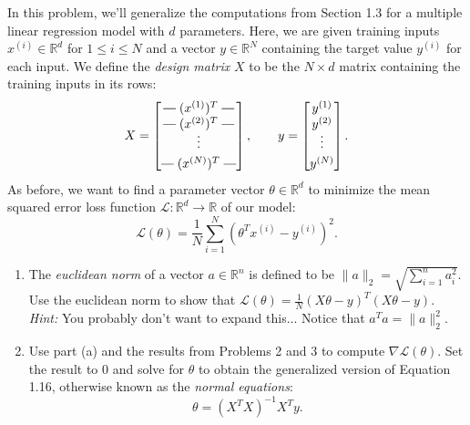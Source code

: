 \documentclass{article}
\newcommand{\R}{\mathbb{R}}
\newcommand{\rotvert}{\rotatebox[origin=c]{90}{$\vert$}}
\newenvironment{envsection}[1]{\begin{trivlist}
\item[\hskip \labelsep {\bfseries #1}]}{\end{trivlist}}
\begin{document}
\begin{envsection}{Problem 4 (Normal Equations).}
    In this problem, we'll generalize the computations from Section 1.3 for a multiple linear regression model with $d$ parameters. Here, we are given training inputs $x^{(i)} \in \R^d$ for $1 \leq i \leq N$ and a vector $y \in \R^N$ containing the target value $y^{(i)}$ for each input. We define the \textit{design matrix} $X$ to be the $N \times d$ matrix containing the training inputs in its rows:
    \[
    X =
    \begin{bmatrix}
        \rotvert\; (x^{(1)})^T \;\rotvert\\
        \rotvert\; (x^{(2)})^T \;\rotvert\vspace{-3pt}\\
        \vdots \vspace{3pt}\\
        \rotvert\; (x^{(N)})^T \;\rotvert
    \end{bmatrix}, \qquad
    y = 
    \begin{bmatrix}
        y^{(1)}\\
        y^{(2)}\vspace{-3pt}\\
        \vdots\vspace{3pt}\\
        y^{(N)}
    \end{bmatrix}.
    \]
    As before, we want to find a parameter vector $\theta \in \R^d$ to minimize the mean squared error loss function $\mathcal{L}: \R^d \to \R$ of our model:
    \[
    \mathcal{L}(\theta) = \frac{1}{N} \sum_{i = 1}^N (\theta^Tx^{(i)} - y^{(i)})^2.
    \] 
    \begin{enumerate}
        \item[(a)] The \textit{euclidean norm} of a vector $a \in \R^n$ is defined to be $\lVert a \rVert_2 = \sqrt{\sum_{i=1}^n a_i^2}$. Use the euclidean norm to show that $\mathcal{L}(\theta) = \frac{1}{N} (X\theta - y)^T(X\theta - y)$. \textit{Hint:} You probably don't want to expand this... Notice that $a^Ta = \lVert a \rVert_2^2$.
        \item[(b)] Use part (a) and the results from Problems 2 and 3 to compute $\nabla\mathcal{L}(\theta)$. Set the result to 0 and solve for $\theta$ to obtain the generalized version of Equation 1.16, otherwise known as the \textit{normal equations}:
            \[
            \theta = (X^TX)^{-1}X^Ty.
            \]
    \end{enumerate}
    
    
\end{envsection}
\end{document}
